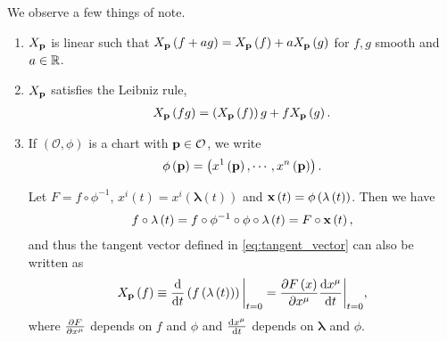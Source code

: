 We observe a few things of note.
\begin{enumerate}[label=\arabic*)]
    \item $X_{\vb{p}}$ is linear such that $X_{\vb{p}}\left( f + a g \right) = X_{\vb{p}}\left( f \right)  + a X_{\vb{p}} \left( g \right) $ for $f,g$ smooth and $a \in \mathbb{R}$.
    \item $X_{\vb{p}}$ satisfies the Leibniz rule,
        \begin{align}
            X_{\vb{p}}\left( fg \right) = \left( X_{\vb{p}}\left( f \right)  \right) g  + f X_{\vb{p}} \left( g  \right) 
        .\end{align}
    \item If $\left( \mathcal{O}, \phi \right) $ is a chart with $\vb{p} \in \mathcal{O}$, we write
        \begin{align}
            \phi \left( \vb{p} \right) = \left( x^{1} \left( \vb{p} \right) , \cdots, x^{n} \left( \vb{p} \right)  \right) 
        .\end{align}

        Let $F = f \circ \phi^{-1}$, $x^{i} \left( t \right) = x^{i} \left( \mathbf{\lambda} \left( t \right)  \right) $ and $\vb{x}\left( t \right) = \phi\left( \lambda \left( t \right)  \right) $. Then we have
        \begin{align}
            f \circ \mathbf{\lambda} \left( t \right) = f \circ \phi^{-1} \circ \phi \circ \mathbf{\lambda} \left( t \right) = F \circ \vb{x} \left( t \right) 
        ,\end{align}
        and thus the tangent vector defined in \cref{eq:tangent_vector} can also be written as
        \begin{align}\label{eq:tangent_vector_2}
            X_{\vb{p}}\left( f \right)  \equiv \dv{t} \left( f \left( \mathbf{\lambda} \left( t \right)  \right)  \right) \bigg|_{t = 0} = \pdv{F\left( x \right) }{x^{\mu}}  \dv{x^{\mu}}{t} \bigg|_{t = 0}
        ,\end{align}
        where $\pdv{F}{x^{\mu}}$ depends on $f$ and $\phi$ and $\dv{x^{\mu}}{t}$ depends on $\mathbf{\lambda}$ and $\phi$.
\end{enumerate}

